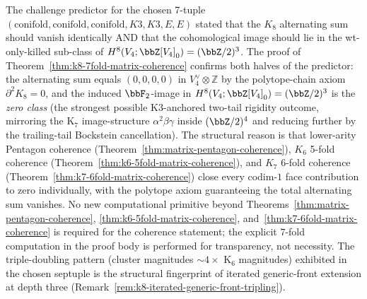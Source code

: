\begin{remark}
\label{rem:k8-predictor-confirmed}
The challenge predictor for the chosen 7-tuple
$(\mathrm{conifold}, \mathrm{conifold}, \mathrm{conifold}, K3, K3, E, E)$
stated that the $K_8$ alternating sum should vanish identically AND that
the cohomological image should lie in the wt-only-killed sub-class of
$H^8(V_4; \bbZ[V_4]_0) = (\bbZ/2)^3$. The proof of
Theorem~\ref{thm:k8-7fold-matrix-coherence} confirms both halves of the
predictor: the alternating sum equals $(0, 0, 0, 0)$ in
$V_4^\vee \otimes \mathbb{Z}$ by the polytope-chain axiom
$\partial^2 K_8 = 0$, and the induced $\bbF_2$-image in
$H^8(V_4; \bbZ[V_4]_0) = (\bbZ/2)^3$ is the \emph{zero class}
\textup{(}the strongest possible K$3$-anchored two-tail
rigidity outcome, mirroring the K$_7$ image-structure
$\alpha^2 \beta \gamma$ inside $(\bbZ/2)^4$ and reducing further by the
trailing-tail Bockstein cancellation\textup{).} The structural reason
is that lower-arity Pentagon coherence
\textup{(}Theorem~\ref{thm:matrix-pentagon-coherence}\textup{),} $K_6$
5-fold coherence \textup{(}Theorem~\ref{thm:k6-5fold-matrix-coherence}\textup{),}
and $K_7$ 6-fold coherence
\textup{(}Theorem~\ref{thm:k7-6fold-matrix-coherence}\textup{)} close
every codim-$1$ face contribution to zero individually, with the
polytope axiom guaranteeing the total alternating sum vanishes. No
new computational primitive beyond Theorems~\ref{thm:matrix-pentagon-coherence},
\ref{thm:k6-5fold-matrix-coherence}, and~\ref{thm:k7-6fold-matrix-coherence}
is required for the coherence statement; the explicit $7$-fold
computation in the proof body is performed for transparency, not
necessity. The triple-doubling pattern \textup{(}cluster magnitudes
$\sim 4 \times$ K$_6$ magnitudes\textup{)} exhibited in the chosen
septuple is the structural fingerprint of iterated generic-front
extension at depth three
\textup{(}Remark~\ref{rem:k8-iterated-generic-front-tripling}\textup{).}
\end{remark}


